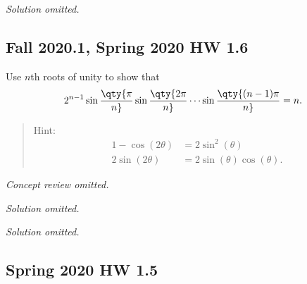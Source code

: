 \emph{Solution omitted.}

\hypertarget{fall-2020.1-spring-2020-hw-1.6}{%
\subsection{Fall 2020.1, Spring 2020 HW
1.6}\label{fall-2020.1-spring-2020-hw-1.6}}

\begin{problem}[?]

Use \(n\)th roots of unity to show that
\begin{align*}
2^{n-1} \sin\qty{\pi \over n} \sin\qty{2\pi \over n} \cdots \sin\qty{(n-1)\pi \over n} = n
.\end{align*}

\begin{quote}
Hint:
\begin{align*}
1 - \cos(2\theta) &= 2\sin^2(\theta) \\
2 \sin(2\theta) &= 2\sin(\theta) \cos(\theta)
.\end{align*}
\end{quote}

\end{problem}

\emph{Concept review omitted.}

\emph{Solution omitted.}

\emph{Solution omitted.}

\hypertarget{spring-2020-hw-1.5-1}{%
\subsection{Spring 2020 HW 1.5}\label{spring-2020-hw-1.5-1}}

